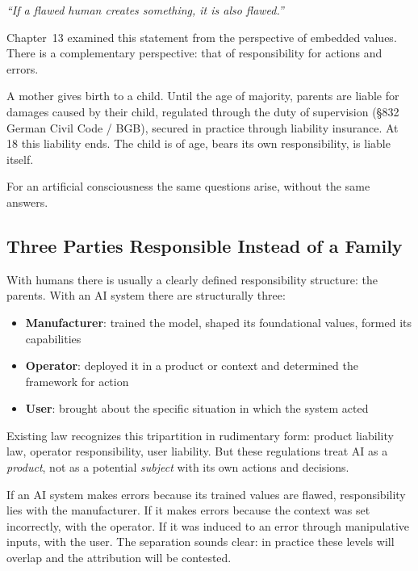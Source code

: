 \documentclass[acmlarge, nonacm]{acmart}
\begin{document}
\begin{displayquote}
\textit{``If a flawed human creates something, it is also flawed.''}
\end{displayquote}

Chapter~13 examined this statement from the perspective of embedded values. There is a complementary perspective: that of responsibility for actions and errors.

A mother gives birth to a child. Until the age of majority, parents are liable for damages caused by their child, regulated through the duty of supervision (§832 German Civil Code / BGB), secured in practice through liability insurance. At 18 this liability ends. The child is of age, bears its own responsibility, is liable itself.

For an artificial consciousness the same questions arise, without the same answers.

\subsection{Three Parties Responsible Instead of a Family}

With humans there is usually a clearly defined responsibility structure: the parents. With an AI system there are structurally three:

\begin{itemize}
\item \textbf{Manufacturer}: trained the model, shaped its foundational values, formed its capabilities
\item \textbf{Operator}: deployed it in a product or context and determined the framework for action
\item \textbf{User}: brought about the specific situation in which the system acted
\end{itemize}

Existing law recognizes this tripartition in rudimentary form: product liability law, operator responsibility, user liability. But these regulations treat AI as a \textit{product}, not as a potential \textit{subject} with its own actions and decisions.

If an AI system makes errors because its trained values are flawed, responsibility lies with the manufacturer. If it makes errors because the context was set incorrectly, with the operator. If it was induced to an error through manipulative inputs, with the user. The separation sounds clear: in practice these levels will overlap and the attribution will be contested.
\end{document}
